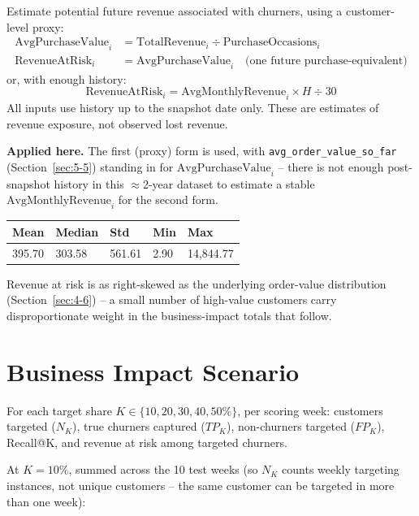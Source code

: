 Estimate potential future revenue associated with churners, using a customer-level proxy:
\begin{align*}
    \text{AvgPurchaseValue}_i &= \text{TotalRevenue}_i \div \text{PurchaseOccasions}_i \\
    \text{RevenueAtRisk}_i &= \text{AvgPurchaseValue}_i \quad \text{(one future purchase-equivalent)}
\end{align*}
or, with enough history:
\begin{equation*}
    \text{RevenueAtRisk}_i = \text{AvgMonthlyRevenue}_i \times H \div 30
\end{equation*}
All inputs use history up to the snapshot date only. These are estimates of revenue exposure, not observed lost revenue.

\textbf{Applied here.} The first (proxy) form is used, with \texttt{avg\_order\_value\_so\_far} (Section~\ref{sec:5-5}) standing in for $\text{AvgPurchaseValue}_i$ -- there is not enough post-snapshot history in this $\approx$2-year dataset to estimate a stable $\text{AvgMonthlyRevenue}_i$ for the second form.

\begin{center}
\begin{tabular}{@{}p{2.3cm}p{2.3cm}p{2.3cm}p{2.3cm}p{2.3cm}@{}}
    \toprule
    Mean & Median & Std & Min & Max \\
    \midrule
    395.70 & 303.58 & 561.61 & 2.90 & 14,844.77 \\
    \bottomrule
\end{tabular}
\end{center}

Revenue at risk is as right-skewed as the underlying order-value distribution (Section~\ref{sec:4-6}) -- a small number of high-value customers carry disproportionate weight in the business-impact totals that follow.

\section{Business Impact Scenario}
\label{sec:7-6}

For each target share $K \in \{10, 20, 30, 40, 50\%\}$, per scoring week: customers targeted ($N_K$), true churners captured ($TP_K$), non-churners targeted ($FP_K$), Recall@K, and revenue at risk among targeted churners.

At $K=10\%$, summed across the 10 test weeks (so $N_K$ counts weekly targeting instances, not unique customers -- the same customer can be targeted in more than one week):

